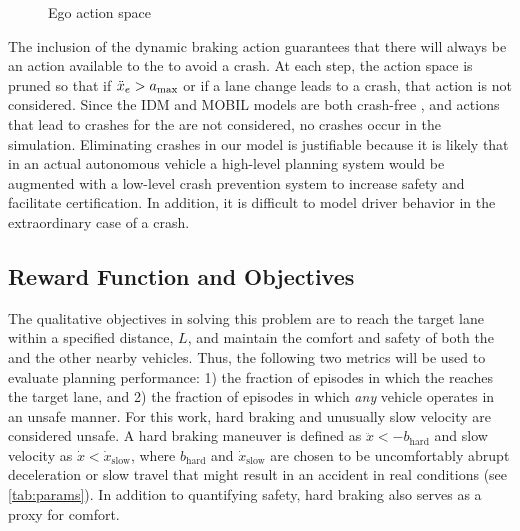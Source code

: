 \begin{figure}[tb]
    \centering
    
    
    \caption{Ego action space}
    \label{fig:actions}
\end{figure}


The inclusion of the dynamic braking action guarantees that there will always be an action available to the \av{} to avoid a crash.
At each step, the action space is pruned so that if ${\ddot{x}}_e > a_\text{max}$ or if a lane change leads to a crash, that action is not considered.
Since the IDM and MOBIL models are both crash-free \cite{kesting2009agents}, and actions that lead to crashes for the \av{} are not considered, no crashes occur in the simulation.
Eliminating crashes in our model is justifiable because it is likely that in an actual autonomous vehicle a high-level planning system would be augmented with a low-level crash prevention system to increase safety and facilitate certification. 
In addition, it is difficult to model driver behavior in the extraordinary case of a crash. 

\subsection{Reward Function and Objectives} \label{sec:reward}

The qualitative objectives in solving this problem are to reach the target lane within a specified distance, $L$, and maintain the comfort and safety of both the \av{} and the other nearby vehicles.
Thus, the following two metrics will be used to evaluate planning performance: 1) the fraction of episodes in which the \av{} reaches the target lane, and 2) the fraction of episodes in which \emph{any} vehicle operates in an unsafe manner.
For this work, hard braking and unusually slow velocity are considered unsafe.
A hard braking maneuver is defined as $\ddot{x} < -b_\text{hard}$ and slow velocity as $\dot{x} < \dot{x}_\text{slow}$, where $b_\text{hard}$ and $\dot{x}_\text{slow}$ are chosen to be uncomfortably abrupt deceleration or slow travel that might result in an accident in real conditions (see \cref{tab:params}).
In addition to quantifying safety, hard braking also serves as a proxy for comfort.

